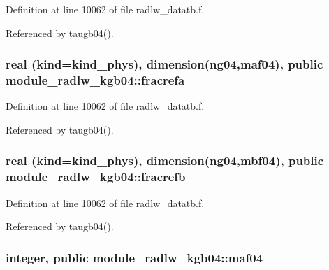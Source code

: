 Definition at line 10062 of file radlw\+\_\+datatb.\+f.



Referenced by taugb04().

\subsubsection[{\texorpdfstring{fracrefa}{fracrefa}}]{\setlength{\rightskip}{0pt plus 5cm}real (kind=kind\+\_\+phys), dimension(ng04,{\bf maf04}), public module\+\_\+radlw\+\_\+kgb04\+::fracrefa}\hypertarget{namespacemodule__radlw__kgb04_ace1d87742e2c543d9b0662e1c7d2b624}{}\label{namespacemodule__radlw__kgb04_ace1d87742e2c543d9b0662e1c7d2b624}


Definition at line 10062 of file radlw\+\_\+datatb.\+f.



Referenced by taugb04().

\subsubsection[{\texorpdfstring{fracrefb}{fracrefb}}]{\setlength{\rightskip}{0pt plus 5cm}real (kind=kind\+\_\+phys), dimension(ng04,{\bf mbf04}), public module\+\_\+radlw\+\_\+kgb04\+::fracrefb}\hypertarget{namespacemodule__radlw__kgb04_ae8d5d56d09dfbe06d918c6b098e3fddf}{}\label{namespacemodule__radlw__kgb04_ae8d5d56d09dfbe06d918c6b098e3fddf}


Definition at line 10062 of file radlw\+\_\+datatb.\+f.



Referenced by taugb04().

\subsubsection[{\texorpdfstring{maf04}{maf04}}]{\setlength{\rightskip}{0pt plus 5cm}integer, public module\+\_\+radlw\+\_\+kgb04\+::maf04}\hypertarget{namespacemodule__radlw__kgb04_a60ff35def4e526c7d9cf3ec88bdd4485}{}\label{namespacemodule__radlw__kgb04_a60ff35def4e526c7d9cf3ec88bdd4485}


